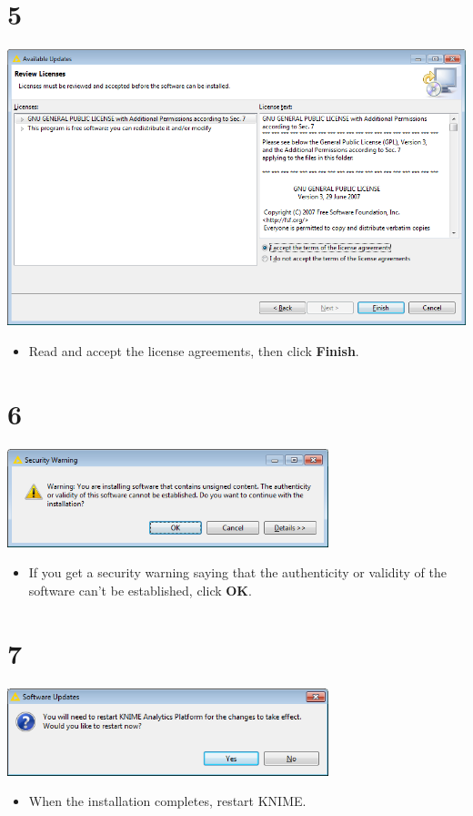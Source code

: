 \documentclass{beamer}
\begin{document}
\section{5}
\begin{frame}
	\begin{center}
  		\includegraphics[height=0.6\textheight]{5.png}
	\end{center}
	\begin{itemize}
		\item Read and accept the license agreements, then click \textbf{Finish}.
	\end{itemize}
\end{frame}

\section{6}
\begin{frame}
	\begin{center}
  		\includegraphics[width=0.7\textwidth]{6.png}
	\end{center}
	\begin{itemize}
		\item If you get a security warning saying that the authenticity or validity of the software can’t be established, click \textbf{OK}.
	\end{itemize}
\end{frame}

\section{7}
\begin{frame}
	\begin{center}
  		\includegraphics[width=0.7\textwidth]{7.png}
	\end{center}
	\begin{itemize}
		\item When the installation completes, restart KNIME.
	\end{itemize}
\end{frame}
\end{document}
